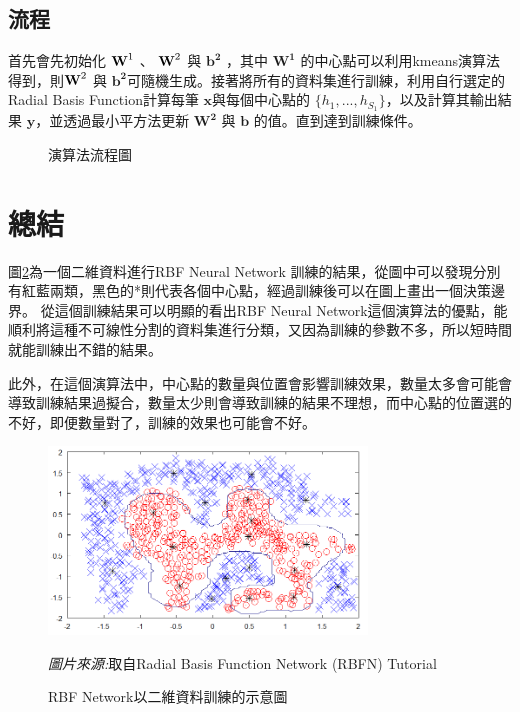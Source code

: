 \subsection{流程}

首先會先初始化 \(\textbf W^1\)  、 \(\textbf W^2\) 與 \(\mathbf{b^2}\) ，其中 \(\mathbf{W^1}\) 的中心點可以利用kmeans演算法得到，則\(\textbf W^2\) 與 \(\mathbf{b^2}\)可隨機生成。接著將所有的資料集進行訓練，利用自行選定的Radial Basis Function計算每筆 \(\mathbf x\)與每個中心點的 \(\{h_1,...,h_{S_1}\}\)，以及計算其輸出結果 \(\mathbf{y}\)，並透過最小平方法更新 \(\mathbf{W^2}\) 與 \(\mathbf{b}\) 的值。直到達到訓練條件。

\begin{figure}[H]
	\centering
	
	\caption{演算法流程圖}
	\label{fig:alogrithm_workflow}
\end{figure}

\section {總結}
圖\ref{fig:rbf_outcome}為一個二維資料進行RBF Neural Network 訓練的結果，從圖中可以發現分別有紅藍兩類，黑色的*則代表各個中心點，經過訓練後可以在圖上畫出一個決策邊界。
從這個訓練結果可以明顯的看出RBF Neural Network這個演算法的優點，能順利將這種不可線性分割的資料集進行分類，又因為訓練的參數不多，所以短時間就能訓練出不錯的結果。

此外，在這個演算法中，中心點的數量與位置會影響訓練效果，數量太多會可能會導致訓練結果過擬合，數量太少則會導致訓練的結果不理想，而中心點的位置選的不好，即便數量對了，訓練的效果也可能會不好。




\begin{figure}[h]
		\centering
		\includegraphics[height=5cm]{./pic/v35Qta6w.png}
		\caption{RBF Network以二維資料訓練的示意圖}
		\begin{minipage}{.7\linewidth}
		\centering
        \footnotesize
		\emph{圖片來源:}取自Radial Basis Function Network (RBFN) Tutorial 
    \end{minipage}
		\label{fig:rbf_outcome}
	\end{figure}

